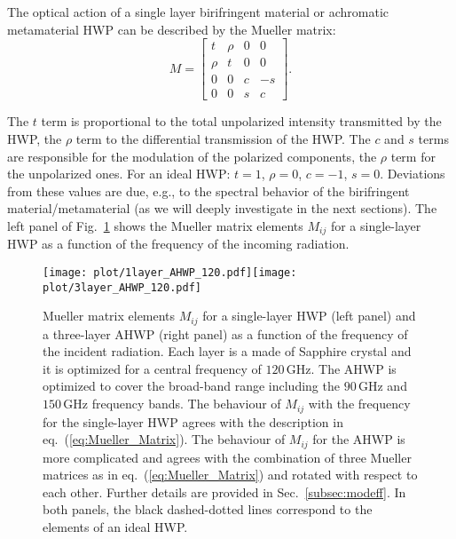 The optical action of a single layer birifringent material or achromatic metamaterial HWP can be described by the Mueller matrix:
\begin{equation}
M=\begin{bmatrix}
   t  &\rho  &0  &0\\
   \rho  &t  &0  &0\\
   0  &0  &c  &-s\\
   0  &0  &s  &c
\end{bmatrix}.
\label{eq:Mueller_Matrix}
\end{equation}

The $t$ term is proportional to the total unpolarized intensity transmitted by the HWP, the $\rho$ term to the differential transmission of the HWP. The $c$ and $s$ terms are responsible for the modulation of the polarized components, the $\rho$ term for the unpolarized ones. For an ideal HWP: $t=1$, $\rho=0$, $c=-1$, $s=0$. Deviations from these values are due, e.g., to the spectral behavior of the birifringent material/metamaterial (as we will deeply investigate in the next sections). The left panel of Fig.~\ref{fig:Mueller_elements} shows the Mueller matrix elements $M_{ij}$ for a single-layer HWP as a function of the frequency of the incoming radiation. 

\begin{figure}
\begin{center}
\texttt{[image: plot/1layer\_AHWP\_120.pdf]}\texttt{[image: plot/3layer\_AHWP\_120.pdf]}
\end{center}
\caption{Mueller matrix elements $M_{ij}$ for a single-layer HWP (left panel) and a three-layer AHWP (right panel) as a function of the frequency of the incident radiation. Each layer is a made of Sapphire crystal and it is optimized for a central frequency of $120\,\mathrm{GHz}$. The AHWP is optimized to cover the broad-band range including the $90\,\mathrm{GHz}$ and $150\,\mathrm{GHz}$ frequency bands. The behaviour of $M_{ij}$ with the frequency for the single-layer HWP agrees with the description in eq.~(\ref{eq:Mueller_Matrix}). The behaviour of $M_{ij}$ for the AHWP is more complicated and agrees with the combination of three Mueller matrices as in eq.~(\ref{eq:Mueller_Matrix}) and rotated with respect to each other. Further details are provided in Sec.~\ref{subsec:modeff}. In both panels, the black dashed-dotted lines correspond to the elements of an ideal HWP.}\label{fig:Mueller_elements}
\end{figure}

